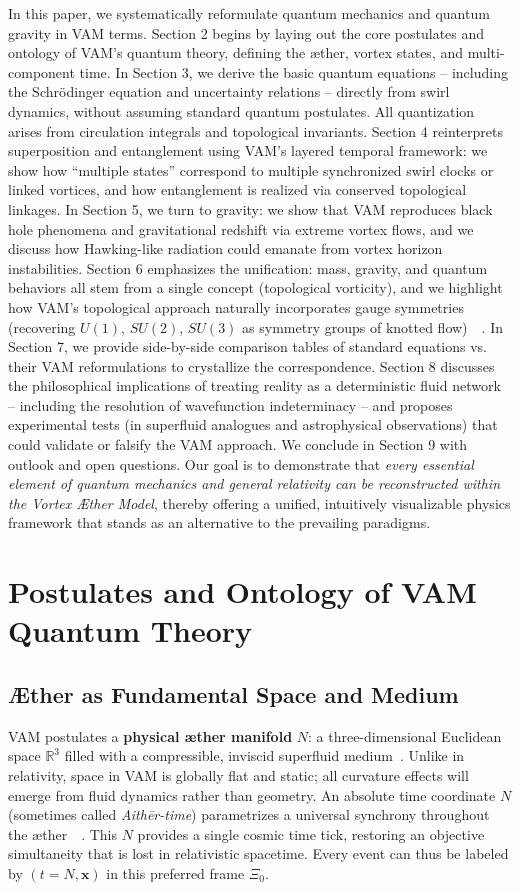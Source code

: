 \documentclass[a4paper,12pt]{article}
\begin{document}
    In this paper, we systematically reformulate quantum mechanics and quantum gravity in VAM terms. Section 2 begins by laying out the core postulates and ontology of VAM’s quantum theory, defining the æther, vortex states, and multi-component time. In Section 3, we derive the basic quantum equations -- including the Schrödinger equation and uncertainty relations -- directly from swirl dynamics, without assuming standard quantum postulates. All quantization arises from circulation integrals and topological invariants. Section 4 reinterprets superposition and entanglement using VAM’s layered temporal framework: we show how “multiple states” correspond to multiple synchronized swirl clocks or linked vortices, and how entanglement is realized via conserved topological linkages. In Section 5, we turn to gravity: we show that VAM reproduces black hole phenomena and gravitational redshift via extreme vortex flows, and we discuss how Hawking-like radiation could emanate from vortex horizon instabilities. Section 6 emphasizes the unification: mass, gravity, and quantum behaviors all stem from a single concept (topological vorticity), and we highlight how VAM’s topological approach naturally incorporates gauge symmetries (recovering $U(1)$, $SU(2)$, $SU(3)$ as symmetry groups of knotted flow)~\cite{reference_12}~\cite{reference_13}. In Section 7, we provide side-by-side comparison tables of standard equations vs. their VAM reformulations to crystallize the correspondence. Section 8 discusses the philosophical implications of treating reality as a deterministic fluid network -- including the resolution of wavefunction indeterminacy -- and proposes experimental tests (in superfluid analogues and astrophysical observations) that could validate or falsify the VAM approach. We conclude in Section 9 with outlook and open questions. Our goal is to demonstrate that \emph{every essential element of quantum mechanics and general relativity can be reconstructed within the Vortex Æther Model}, thereby offering a unified, intuitively visualizable physics framework that stands as an alternative to the prevailing paradigms.

\section{Postulates and Ontology of VAM Quantum Theory}
    \subsection{Æther as Fundamental Space and Medium}
    VAM postulates a \textbf{physical æther manifold} $N$: a three-dimensional Euclidean space $\mathbb{R}^3$ filled with a compressible, inviscid superfluid medium~\cite{reference_14}. Unlike in relativity, space in VAM is globally flat and static; all curvature effects will emerge from fluid dynamics rather than geometry. An absolute time coordinate $N$ (sometimes called \emph{Aithēr-time}) parametrizes a universal synchrony throughout the æther~~\cite{reference_15,reference_16}. This $N$ provides a single cosmic time tick, restoring an objective simultaneity that is lost in relativistic spacetime. Every event can thus be labeled by $(t=N, \mathbf{x})$ in this preferred frame $\Xi_0$.
\end{document}
